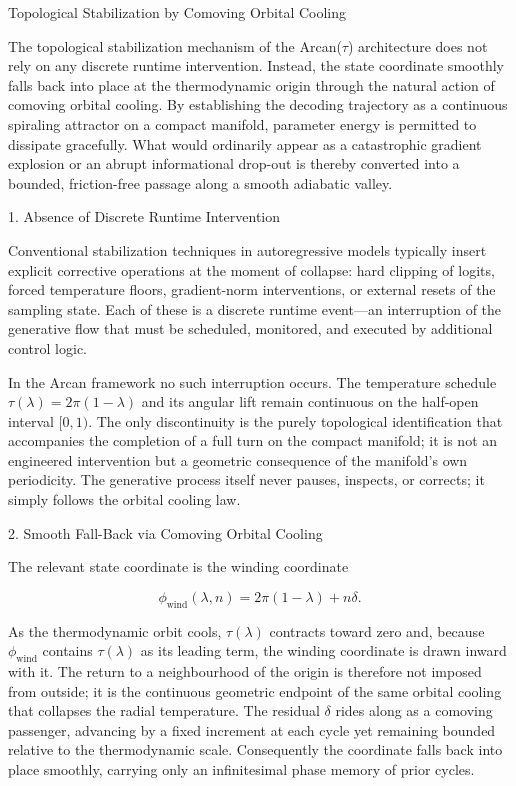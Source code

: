 Topological Stabilization by Comoving Orbital Cooling

The topological stabilization mechanism of the Arcan(\(\tau\)) architecture does not rely on any discrete runtime intervention. Instead, the state coordinate smoothly falls back into place at the thermodynamic origin through the natural action of comoving orbital cooling. By establishing the decoding trajectory as a continuous spiraling attractor on a compact manifold, parameter energy is permitted to dissipate gracefully. What would ordinarily appear as a catastrophic gradient explosion or an abrupt informational drop-out is thereby converted into a bounded, friction-free passage along a smooth adiabatic valley.

1. Absence of Discrete Runtime Intervention

Conventional stabilization techniques in autoregressive models typically insert explicit corrective operations at the moment of collapse: hard clipping of logits, forced temperature floors, gradient-norm interventions, or external resets of the sampling state. Each of these is a discrete runtime event—an interruption of the generative flow that must be scheduled, monitored, and executed by additional control logic.  

In the Arcan framework no such interruption occurs. The temperature schedule \(\tau(\lambda)=2\pi(1-\lambda)\) and its angular lift remain continuous on the half-open interval \([0,1)\). The only discontinuity is the purely topological identification that accompanies the completion of a full turn on the compact manifold; it is not an engineered intervention but a geometric consequence of the manifold’s own periodicity. The generative process itself never pauses, inspects, or corrects; it simply follows the orbital cooling law.

2. Smooth Fall-Back via Comoving Orbital Cooling

The relevant state coordinate is the winding coordinate

\[
\phi_{\mathrm{wind}}(\lambda,n)=2\pi(1-\lambda)+n\delta.
\]

As the thermodynamic orbit cools, \(\tau(\lambda)\) contracts toward zero and, because \(\phi_{\mathrm{wind}}\) contains \(\tau(\lambda)\) as its leading term, the winding coordinate is drawn inward with it. The return to a neighbourhood of the origin is therefore not imposed from outside; it is the continuous geometric endpoint of the same orbital cooling that collapses the radial temperature. The residual \(\delta\) rides along as a comoving passenger, advancing by a fixed increment at each cycle yet remaining bounded relative to the thermodynamic scale. Consequently the coordinate falls back into place smoothly, carrying only an infinitesimal phase memory of prior cycles.

